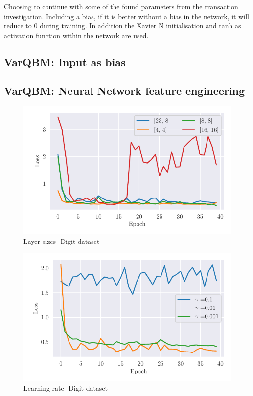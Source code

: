 \documentclass[../main.tex]{subfiles}
\begin{document}
Choosing to continue with some of the found parameters from the transaction investigation. Including a bias, if it is better without a bias in the network, it will reduce to 0 during training. In addition the Xavier N initialisation and tanh as activation function within the network are used.

\subsection{VarQBM: Input as bias}
\subsection{VarQBM: Neural Network feature engineering}

\begin{figure}
    \begin{center}
        \includegraphics{figures/H2_NNsizes_tr.pdf}
        \caption{Layer sizes- Digit dataset}
        \label{fig:loss_epoch_layers}
    \end{center}
\end{figure}

\begin{figure}
    \begin{center}
        \includegraphics{figures/H2_lr_mnist_tr.pdf}
        \caption{Learning rate- Digit dataset}
        \label{fig:loss_ep_gamma}
    \end{center}
\end{figure}
\end{document}
